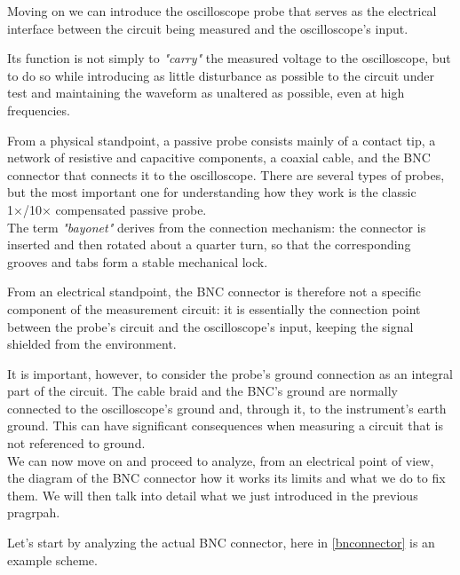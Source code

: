 \documentclass[../main.tex]{subfiles}
\begin{document}
Moving on we can introduce the oscilloscope probe that serves as the electrical interface between the circuit being measured and the oscilloscope’s input. 

Its function is not simply to \textit{"carry"} the measured voltage to the oscilloscope, but to do so while introducing as little disturbance as possible to the circuit under test and maintaining the waveform as unaltered as possible, even at high frequencies.

From a physical standpoint, a passive probe consists mainly of a contact tip, a network of resistive and capacitive components, a coaxial cable, and the BNC connector that connects it to the oscilloscope. There are several types of probes, but the most important one for understanding how they work is the classic 1×/10× compensated passive probe.\\

The term \textit{"bayonet"} derives from the connection mechanism: the connector is inserted and then rotated about a quarter turn, so that the corresponding grooves and tabs form a stable mechanical lock.

From an electrical standpoint, the BNC connector is therefore not a specific component of the measurement circuit: it is essentially the connection point between the probe’s circuit and the oscilloscope’s input, keeping the signal shielded from the environment.

It is important, however, to consider the probe’s ground connection as an integral part of the circuit. The cable braid and the BNC’s ground are normally connected to the oscilloscope’s ground and, through it, to the instrument’s earth ground. This can have significant consequences when measuring a circuit that is not referenced to ground.\\

We can now move on and proceed to analyze, from an electrical point of view, the diagram of the BNC connector how it works its limits and what we do to fix them. We will then talk into detail what we just introduced in the previous pragrpah.

Let's start by analyzing the actual BNC connector, here in \autoref{bnconnector} is an example scheme.
\end{document}
